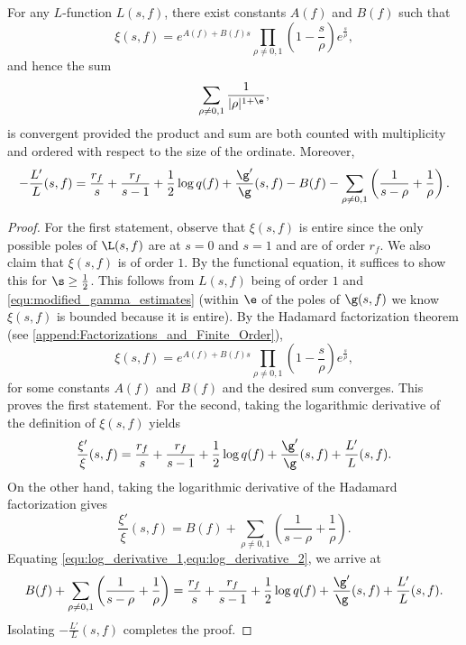     \begin{proposition}\label{prop:explicit_formula_log_derivative}
      For any $L$-function $L(s,f)$, there exist constants $A(f)$ and $B(f)$ such that
      \[
        \xi(s,f) = e^{A(f)+B(f)s}\prod_{\rho \neq 0,1}\left(1-\frac{s}{\rho}\right)e^{\frac{s}{\rho}},
      \]
      and hence the sum
      \[
        \sum_{\rho \neq 0,1}\frac{1}{|\rho|^{1+\e}},
      \]
      is convergent provided the product and sum are both counted with multiplicity and ordered with respect to the size of the ordinate. Moreover,
      \[
        -\frac{L'}{L}(s,f) = \frac{r_{f}}{s}+\frac{r_{f}}{s-1}+\frac{1}{2}\log{q(f)}+\frac{\g'}{\g}(s,f)-B(f)-\sum_{\rho \neq 0,1}\left(\frac{1}{s-\rho}+\frac{1}{\rho}\right).
      \]
    \end{proposition}
    \begin{proof}
      For the first statement, observe that $\xi(s,f)$ is entire since the only possible poles of $\L(s,f)$ are at $s = 0$ and $s = 1$ and are of order $r_{f}$. We also claim that $\xi(s,f)$ is of order $1$. By the functional equation, it suffices to show this for $\s \ge \frac{1}{2}$. This follows from $L(s,f)$ being of order $1$ and \cref{equ:modified_gamma_estimates} (within $\e$ of the poles of $\g(s,f)$ we know $\xi(s,f)$ is bounded because it is entire). By the Hadamard factorization theorem (see \cref{append:Factorizations_and_Finite_Order}),
       \[
        \xi(s,f) = e^{A(f)+B(f)s}\prod_{\rho \neq 0,1}\left(1-\frac{s}{\rho}\right)e^{\frac{s}{\rho}},
      \]
      for some constants $A(f)$ and $B(f)$ and the desired sum converges. This proves the first statement. For the second, taking the logarithmic derivative of the definition of $\xi(s,f)$ yields
      \begin{equation}\label{equ:log_derivative_1}
        \frac{\xi'}{\xi}(s,f) = \frac{r_{f}}{s}+\frac{r_{f}}{s-1}+\frac{1}{2}\log{q(f)}+\frac{\g'}{\g}(s,f)+\frac{L'}{L}(s,f).
      \end{equation}
      On the other hand, taking the logarithmic derivative of the Hadamard factorization gives
      \begin{equation}\label{equ:log_derivative_2}
        \frac{\xi'}{\xi}(s,f) = B(f)+\sum_{\rho \neq 0,1}\left(\frac{1}{s-\rho}+\frac{1}{\rho}\right).
      \end{equation}
      Equating \cref{equ:log_derivative_1,equ:log_derivative_2}, we arrive at
      \[
        B(f)+\sum_{\rho \neq 0,1}\left(\frac{1}{s-\rho}+\frac{1}{\rho}\right) = \frac{r_{f}}{s}+\frac{r_{f}}{s-1}+\frac{1}{2}\log{q(f)}+\frac{\g'}{\g}(s,f)+\frac{L'}{L}(s,f).
      \]
      Isolating $-\frac{L'}{L}(s,f)$ completes the proof.
    \end{proof}

